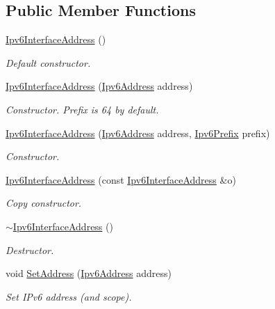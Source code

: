 \subsection*{Public Member Functions}
\begin{DoxyCompactItemize}
\item 
\hyperlink{classns3_1_1Ipv6InterfaceAddress_a2ea4574630be9804cde83e9ebddd4342}{Ipv6\+Interface\+Address} ()
\begin{DoxyCompactList}\small\item\em Default constructor. \end{DoxyCompactList}\item 
\hyperlink{classns3_1_1Ipv6InterfaceAddress_ab38c7d93c621237ac747379d48a65b22}{Ipv6\+Interface\+Address} (\hyperlink{classns3_1_1Ipv6Address}{Ipv6\+Address} address)
\begin{DoxyCompactList}\small\item\em Constructor. Prefix is 64 by default. \end{DoxyCompactList}\item 
\hyperlink{classns3_1_1Ipv6InterfaceAddress_a89994c5821b84bb87128ee09fd2c5522}{Ipv6\+Interface\+Address} (\hyperlink{classns3_1_1Ipv6Address}{Ipv6\+Address} address, \hyperlink{classns3_1_1Ipv6Prefix}{Ipv6\+Prefix} prefix)
\begin{DoxyCompactList}\small\item\em Constructor. \end{DoxyCompactList}\item 
\hyperlink{classns3_1_1Ipv6InterfaceAddress_ac6dde13e0f51fd8db2fd7b42862922a2}{Ipv6\+Interface\+Address} (const \hyperlink{classns3_1_1Ipv6InterfaceAddress}{Ipv6\+Interface\+Address} \&o)
\begin{DoxyCompactList}\small\item\em Copy constructor. \end{DoxyCompactList}\item 
\hyperlink{classns3_1_1Ipv6InterfaceAddress_a1231d8648272d36daedb45aff78f401e}{$\sim$\+Ipv6\+Interface\+Address} ()
\begin{DoxyCompactList}\small\item\em Destructor. \end{DoxyCompactList}\item 
void \hyperlink{classns3_1_1Ipv6InterfaceAddress_a2aa170b0aa646252f4754abed77db8ec}{Set\+Address} (\hyperlink{classns3_1_1Ipv6Address}{Ipv6\+Address} address)
\begin{DoxyCompactList}\small\item\em Set I\+Pv6 address (and scope). \end{DoxyCompactList}\item 

\end{DoxyCompactItemize}
